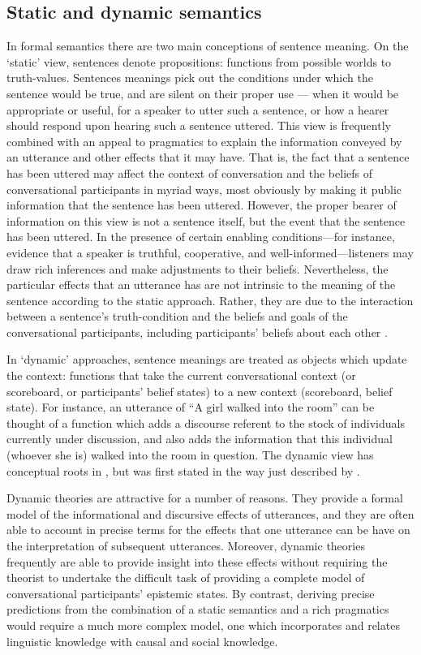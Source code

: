 \documentclass[12pt]{article}
\begin{document}
\subsection{Static and dynamic semantics}
In formal semantics there are two main conceptions of sentence meaning. On the `static' view, sentences denote propositions: functions from possible worlds to truth-values. Sentences meanings pick out the conditions under which the sentence would be true, and are silent on their proper use --- when it would be appropriate or useful, for a speaker to utter such a sentence, or how a hearer should respond upon hearing such a sentence uttered. This view is frequently combined with an appeal to pragmatics to explain the information conveyed by an utterance and other effects that it may have. That is, the fact that a sentence has been uttered may affect the context of conversation and the beliefs of conversational participants in myriad ways, most obviously by making it public information that the sentence has been uttered. However, the proper bearer of information on this view is not a sentence itself, but the event that the sentence has been uttered. In the presence of certain enabling conditions---for instance, evidence that a speaker is truthful, cooperative, and well-informed---listeners may draw rich inferences and make adjustments to their beliefs. Nevertheless, the particular effects that an utterance has are not intrinsic to the meaning of the sentence according to the static approach. Rather, they are due to the interaction between a sentence's truth-condition and the beliefs and goals of the conversational participants, including participants' beliefs about each other \citep[cf.]{grice89,stalnaker78,stalnaker02,clark96}.

In `dynamic' approaches, sentence meanings are treated as objects which update the context: functions that take the current conversational context (or scoreboard, or participants' belief states) to a new context (scoreboard, belief state). For instance, an utterance of ``A girl walked into the room'' can be thought of a function which adds a discourse referent to the stock of individuals currently under discussion, and also adds the information that this individual (whoever she is) walked into the room in question. The dynamic view has conceptual roots in \citet{karttunen69,stalnaker78,lewis79}, but was first stated in the way just described by \citet{heim82,kamp82}. 

Dynamic theories are attractive for a number of reasons. They provide a formal model of the informational and discursive effects of utterances, and they are often able to account in precise terms for the effects that one utterance can be have on the interpretation of subsequent utterances. Moreover, dynamic theories frequently are able to provide insight into these effects without requiring the theorist to undertake the difficult task of providing a complete model of conversational participants' epistemic states. By contrast, deriving precise predictions from the combination of a static semantics and a rich pragmatics would require a much more complex model, one which incorporates and relates linguistic knowledge with causal and social knowledge.
\end{document}
